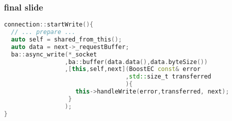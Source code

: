 \begin{frame}[fragile]
 \frametitle{final slide}
  

\begin{center}

\begin{lstlisting}[language=c++]
connection::startWrite(){
  // ... prepare ...
  auto self = shared_from_this();
  auto data = next->_requestBuffer;
  ba::async_write(*_socket
                 ,ba::buffer(data.data(),data.byteSize())
                 ,[this,self,next](BoostEC const& error
								  ,std::size_t transferred
								  ){
                    this->handleWrite(error,transferred, next);
                  }
                 );
}
\end{lstlisting}

\end{center}

  
\end{frame}

